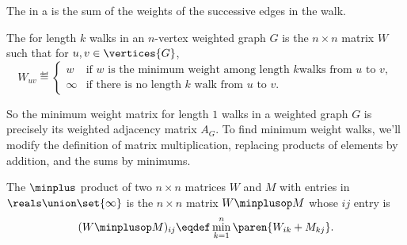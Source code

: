 \begin{definition}\label{def:5H}
  The   in a  is the sum of the weights of
  the successive edges in the walk.
\end{definition}

\iffalse
\arm{cut}
There is good news and bad news to report on this front.  The good
news is that it is not very hard to find a shortest path.  The bad
news is that you can't win one of those million dollar prizes for
doing it.

In fact, there are several good algorithms known for finding a shortest
path between nodes $u$ and $v$ in an $n$-node graph $G$.  The simplest to
explain (but not quite the fastest) is to compute \arm{revised to include
  stopping condition at $n$} the successive powers of $A_G$ one by one up
to the $n$th, watching for the first power at which the $uv$th entry is
nonzero.  That's because Theorem~\ref{thm:CkDm} implies that the length of
the shortest path, if any, between $u$ and~$v$ will be the smallest
value~$k$ for which $(A_G)_{uv}^k$ is nonzero, and if there is a shortest
path, its length will be $\leq n$.
\fi

\begin{definition}
  The  for length $k$ walks in an $n$-vertex
  weighted graph $G$ is the $n \times n$ matrix $W$ such that for $u,v \in \vertices{G}$,
\begin{equation}\label{def:weight_matrix}
W_{uv} \eqdef
\begin{cases} w & \text{if $w$ is the minimum weight among length $k$
                            walks from $u$ to $v$},\\
              \infty & \text{if there is no length $k$ walk from $u$ to $v$}.
\end{cases}
\end{equation}
\end{definition}

So the minimum weight matrix for length $1$ walks in a weighted graph
$G$ is precisely its weighted adjacency matrix $A_G$.  To find minimum
weight walks, we'll modify the definition of matrix multiplication,
replacing products of elements by addition, and the sums by minimums.

\begin{definition}\label{def:minplus}
  The $\minplus$ product of two $n\times n$ matrices $W$ and $M$ with
  entries in $\reals\union \set{\infty}$ is the $n \times n$ matrix
  $W\minplusop M$ whose $ij$ entry is
\[
(W\minplusop M )_{ij} \eqdef \min_{k=1}^n \paren{W_{ik} + M_{kj}}.
\]
\end{definition}

